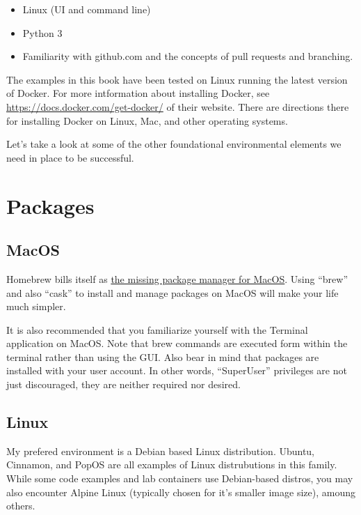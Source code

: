 \begin{itemize}
	\item
	    Linux (UI and command line)
	\item 
        Python 3
	\item
	    Familiarity with github.com and the concepts of pull requests and branching.
\end{itemize}

\justify{}
The examples in this book have been tested on Linux running the latest version of Docker. For more
intformation about installing Docker, see \href{the Get Docker section}{https://docs.docker.com/get-docker/}
of their website. There are directions there for installing Docker on Linux, Mac, and other operating systems.

Let's take a look at some of the other foundational environmental elements we need in place to be successful.

\section{Packages}

\subsection{MacOS}

Homebrew bills itself as \href{https://brew.sh/}{the missing package manager for MacOS}. Using ``brew'' and also
``cask'' to install and manage packages on MacOS will make your life much simpler.

\justify{}
It is also recommended that you familiarize yourself with the Terminal application on MacOS. Note that brew
commands are executed form within the terminal rather than using the GUI. Also bear in mind that packages are
installed with your user account. In other words, ``SuperUser'' privileges are not just discouraged, they are
neither required nor desired.

\subsection{Linux}

My prefered environment is a Debian based Linux distribution. Ubuntu, Cinnamon, and PopOS are all examples of 
Linux distrubutions in this family. While some code examples and lab containers use Debian-based distros, you
may also encounter Alpine Linux (typically chosen for it's smaller image size), amoung others.

